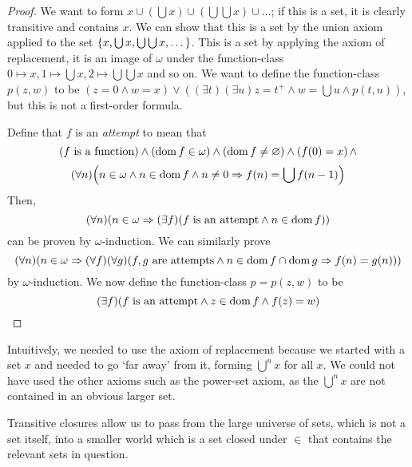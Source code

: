 \begin{proof}
    We want to form \( x \cup (\bigcup x) \cup (\bigcup\bigcup x) \cup \dots \); if this is a set, it is clearly transitive and contains \( x \).
    We can show that this is a set by the union axiom applied to the set \( \qty{x, \bigcup x, \bigcup\bigcup x, \dots} \).
    This is a set by applying the axiom of replacement, it is an image of \( \omega \) under the function-class \( 0 \mapsto x, 1 \mapsto \bigcup x, 2 \mapsto \bigcup \bigcup x \) and so on.
    We want to define the function-class \( p(z,w) \) to be \( (z = 0 \wedge w = x) \vee ((\exists t)(\exists u) z = t^+ \wedge w = \bigcup u \wedge p(t,u)) \), but this is not a first-order formula.

    Define that \( f \) is an \emph{attempt} to mean that
    \[ (f \text{ is a function}) \wedge (\operatorname{dom} f \in \omega) \wedge (\operatorname{dom} f \neq \varnothing) \wedge (f(0) = x)\, \wedge \]
    \[ (\forall n)\qty(n \in \omega \wedge n \in \operatorname{dom} f \wedge n \neq 0 \Rightarrow f(n) = \bigcup f(n-1)) \]
    Then,
    \[ (\forall n)(n \in \omega \Rightarrow (\exists f)(f \text{ is an attempt} \wedge n \in \operatorname{dom} f)) \]
    can be proven by \( \omega \)-induction.
    We can similarly prove
    \[ (\forall n)(n \in \omega \Rightarrow (\forall f)(\forall g)(f, g \text{ are attempts} \wedge n \in \operatorname{dom} f \cap \operatorname{dom} g \Rightarrow f(n) = g(n))) \]
    by \( \omega \)-induction.
    We now define the function-class \( p = p(z,w) \) to be
    \[ (\exists f)(f \text{ is an attempt} \wedge z \in \operatorname{dom} f \wedge f(z) = w) \]
\end{proof}
Intuitively, we needed to use the axiom of replacement because we started with a set \( x \) and needed to go `far away' from it, forming \( \bigcup^n x \) for all \( x \).
We could not have used the other axioms such as the power-set axiom, as the \( \bigcup^n x \) are not contained in an obvious larger set.

Transitive closures allow us to pass from the large universe of sets, which is not a set itself, into a smaller world which is a set closed under \( \in \) that contains the relevant sets in question.

